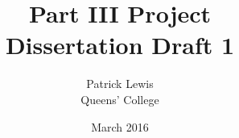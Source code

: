 \documentclass[11pt, oneside]{report}
\title{Part III Project \\Dissertation Draft 1}
\author{Patrick Lewis \\Queens' College}
\date{March 2016}							%
\begin{document}
\maketitle
\begin{abstract}

\end{abstract}
\tableofcontents
\listoffigures

%
%
%
%
%
%

%
%
%
\end{document}
